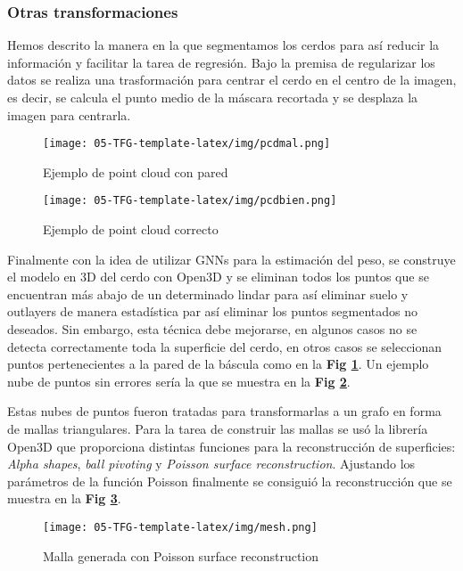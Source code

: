 ﻿\documentclass[10pt,a4paper,twocolumn,twoside]{article}
\begin{document}
    \subsubsection{Otras transformaciones}
    
    Hemos descrito la manera en la que segmentamos los cerdos para así reducir la información y facilitar la tarea de regresión. Bajo la premisa de regularizar los datos se realiza una trasformación para centrar el cerdo en el centro de la imagen, es decir, se calcula el punto medio de la máscara recortada y se desplaza la imagen para centrarla.
    \begin{figure}
\centering
\texttt{[image: 05-TFG-template-latex/img/pcdmal.png]}
\caption{Ejemplo de point cloud con pared}
\label{pcdmal}
\end{figure}

\begin{figure}
\centering
\texttt{[image: 05-TFG-template-latex/img/pcdbien.png]}
\caption{Ejemplo de point cloud correcto}
\label{pcdbien}
\end{figure}
   Finalmente con la idea de utilizar GNNs para la estimación del peso, se construye el modelo en 3D del cerdo con Open3D \cite{open3D} y se eliminan todos los puntos que se encuentran más abajo de un determinado lindar para así eliminar suelo y outlayers de manera estadística par así eliminar los puntos segmentados no deseados. Sin embargo, esta técnica debe mejorarse, en algunos casos no se detecta correctamente toda la superficie del cerdo, en otros casos se seleccionan puntos pertenecientes a la pared de la báscula como en la \textbf{Fig \ref{pcdmal}}. Un ejemplo nube de puntos sin errores sería la que se muestra en la \textbf{Fig \ref{pcdbien}}.
   
Estas nubes de puntos fueron tratadas para transformarlas a un grafo en forma de mallas triangulares.
Para la tarea de construir las mallas se usó la librería Open3D\cite{open3D} que proporciona distintas funciones para la reconstrucción de superficies: \textit{Alpha shapes}, \textit{ball pivoting} y \textit{Poisson surface reconstruction}. Ajustando los parámetros de la función Poisson finalmente se consiguió la reconstrucción que se muestra en la \textbf{Fig \ref{mesh}}.

    \begin{figure}
    \centering
    \texttt{[image: 05-TFG-template-latex/img/mesh.png]}
    \caption{Malla generada con Poisson surface reconstruction}
    \label{mesh}
    \end{figure}
    
\end{document}
